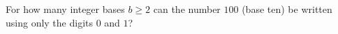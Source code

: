 For how many integer bases $b\ge2$ can the number $100$ (base ten) be written using only the digits $0$ and $1$?
